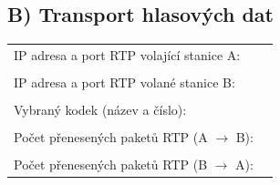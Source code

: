 \documentclass[a4paper,11pt]{article}
\begin{document}
  \subsection*{B) Transport hlasových dat}
  \begin{tabular}{lp{2cm}}
    IP adresa a port RTP volající stanice A: &\\
    &\\
    IP adresa a port RTP volané stanice B: &\\
    &\\
    Vybraný kodek (název a číslo): &\\
    &\\
    Počet přenesených paketů RTP (A $\rightarrow$ B): &\\
    &\\
    Počet přenesených paketů RTP (B $\rightarrow$ A): &\\
\end{tabular}               
\end{document}
